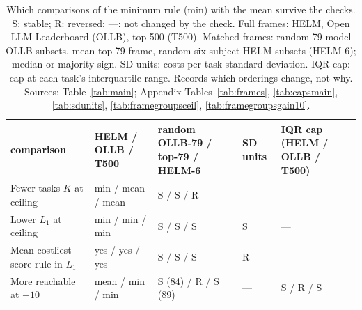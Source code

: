 \begin{table}[tb]
\caption{Which comparisons of the minimum rule (min) with the mean survive the checks. S: stable; R: reversed; ---: not changed by the check. Full frames: HELM, Open LLM Leaderboard (OLLB), top-500 (T500). Matched frames: random 79-model OLLB subsets, mean-top-79 frame, random six-subject HELM subsets (HELM-6); median or majority sign. SD units: costs per task standard deviation. IQR cap: cap at each task's interquartile range. Records which orderings change, not why. Sources: Table~\ref{tab:main}; Appendix Tables~\ref{tab:frames}, \ref{tab:capsmain}, \ref{tab:sdunits}, \ref{tab:framegroupsceil}, \ref{tab:framegroupsgain10}.}
\label{tab:verdict}
\centering\scriptsize\setlength{\tabcolsep}{3pt}
\begin{tabular}{lllll}
\toprule
comparison & HELM / OLLB / T500 & random OLLB-79 / top-79 / HELM-6 & SD units & IQR cap (HELM / OLLB / T500) \\
\midrule
Fewer tasks $K$ at ceiling & min / mean / mean & S / S / R & --- & --- \\
Lower $L_1$ at ceiling & min / min / min & S / S / S & S & --- \\
Mean costliest score rule in $L_1$ & yes / yes / yes & S / S / S & R & --- \\
More reachable at $+10$ & mean / min / min & S (84) / R / S (89) & --- & S / R / S \\
\bottomrule
\end{tabular}
\end{table}

